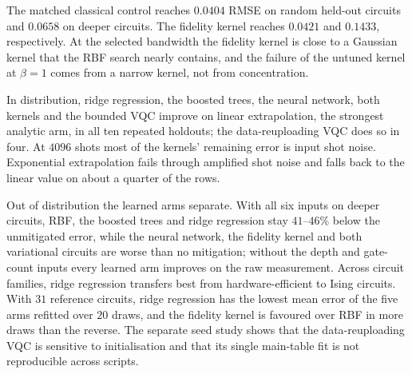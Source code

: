 \documentclass[Thesis.tex]{subfiles}
\begin{document}
The matched classical control reaches $0.0404$ RMSE on random held-out
circuits and $0.0658$ on deeper circuits. The fidelity
kernel reaches $0.0421$ and $0.1433$,
respectively. At the selected bandwidth the fidelity kernel is close to a Gaussian
kernel that the RBF search nearly contains, and the failure of the untuned kernel at
$\beta=1$ comes from a narrow kernel, not from concentration.

In distribution, ridge regression, the boosted trees, the neural network, both
kernels and the bounded VQC improve on linear extrapolation, the strongest analytic arm,
in all ten repeated holdouts; the data-reuploading VQC does so in four. At $4096$ shots
most of the kernels' remaining error is input shot noise. Exponential extrapolation fails through amplified shot noise and
falls back to the linear value on about a quarter of the rows.

Out of distribution the learned arms separate. With all six inputs on deeper circuits,
RBF, the boosted trees and ridge regression stay $41$--$46\%$ below the unmitigated
error, while the neural network, the fidelity kernel and both variational circuits are
worse than no mitigation; without the depth and gate-count inputs every learned arm
improves on the raw measurement. Across circuit families, ridge regression transfers
best from hardware-efficient to Ising circuits. With $31$ reference circuits, ridge
regression has the lowest mean error of the five arms refitted over $20$ draws, and the
fidelity kernel is favoured over RBF in more draws than the reverse. The separate seed study shows that the
data-reuploading VQC is sensitive to initialisation and that its single main-table fit
is not reproducible across scripts.
\end{document}
